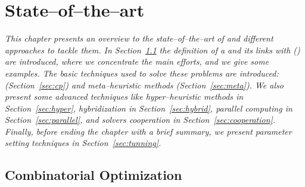 \chapter{State--of--the--art}
\label{chap:art}
\textit{This chapter presents an overview to the state--of--the--art of \COPs{} and different approaches to tackle them. In Section~\ref{sec:combi} the definition of a \COP{} and its links with \CSPs{} (\csp) are introduced, where we concentrate the main efforts, and we give some examples. The basic techniques used to solve these problems are introduced: {\it \cp} (Section~\ref{sec:cp}) and {\it meta--heuristic methods} (Section~\ref{sec:meta}). We also present some advanced techniques like {\it hyper--heuristic methods} in Section~\ref{sec:hyper}, {\it hybridization} in Section~\ref{sec:hybrid}, {\it parallel computing} in Section~\ref{sec:parallel}, and {\it solvers cooperation} in Section~\ref{sec:cooperation}. Finally, before ending the chapter with a brief summary, we present {\it parameter setting techniques} in Section~\ref{sec:tunning}.}
\vfill
\minitoc
\newpage



\section{Combinatorial Optimization}\label{sec:combi}


